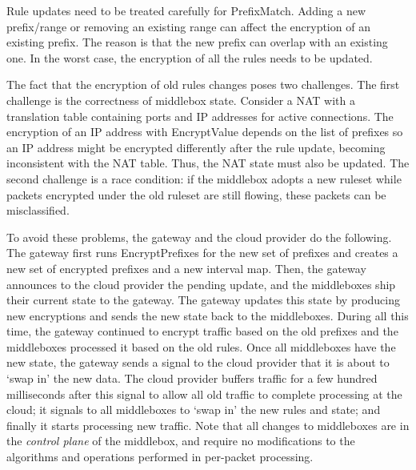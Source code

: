 


\label{sec:updates}
%
Rule updates need to be treated carefully for PrefixMatch.
Adding a new prefix/range or removing an existing range can affect the encryption of an existing prefix. The reason is that the new prefix can overlap with an existing one. In the worst case, the encryption of all the rules needs to be updated. 

The fact that the encryption of old rules changes poses two challenges.
The first challenge is the correctness of middlebox state. Consider a NAT with a translation table containing ports and IP addresses for active connections. The encryption of an IP address with EncryptValue depends on the list of prefixes so an IP address might be encrypted differently after the rule update, becoming inconsistent with the NAT table.
 Thus, the NAT state must also be updated.
The second challenge is a race condition: if the middlebox adopts a new ruleset while packets encrypted under the old ruleset  are still flowing, these packets can be misclassified.


To avoid these problems, the gateway and the cloud provider do the following. 
The gateway first runs EncryptPrefixes for the new set of prefixes and creates a new set of encrypted prefixes and a new interval map. 
Then, the gateway announces to the cloud provider the pending update, and the middleboxes ship their current state to the gateway. The gateway updates this state by producing new encryptions and sends the new state back to the middleboxes. During all this time, the gateway continued to encrypt traffic based on the old prefixes and the middleboxes processed it based on the old rules.
Once all middleboxes have the new state, the gateway sends a signal to the cloud provider that it is about to `swap in' the new data. 
The cloud provider buffers traffic for a few hundred milliseconds after this signal to allow all old traffic to complete processing at the cloud; it signals to all middleboxes to `swap in' the new rules and state; and finally it starts processing new traffic.
Note that all changes to middleboxes are in the {\it control plane} of the middlebox, and require no modifications to the algorithms and operations performed in per-packet processing. 

